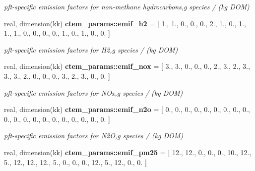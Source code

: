 \begin{DoxyCompactItemize}
\begin{DoxyCompactList}\small\item\em pft-\/specific emission factors for non-\/methane hydrocarbons,g species / (kg D\+O\+M) \end{DoxyCompactList}\item 
\hypertarget{namespacectem__params_a69c1ddbe45fc93ced2664f1fb1781431}{}real, dimension(kk) {\bfseries ctem\+\_\+params\+::emif\+\_\+h2} = \mbox{[} 1., 1., 0., 0., 0., 2., 1., 0., 1., 1., 1., 0., 0., 0., 0., 1., 0., 1., 0., 0. \mbox{]}\label{namespacectem__params_a69c1ddbe45fc93ced2664f1fb1781431}

\begin{DoxyCompactList}\small\item\em pft-\/specific emission factors for H2,g species / (kg D\+O\+M) \end{DoxyCompactList}\item 
\hypertarget{namespacectem__params_a1c3efd30262fdc33811b8179c691fa23}{}real, dimension(kk) {\bfseries ctem\+\_\+params\+::emif\+\_\+nox} = \mbox{[} 3., 3., 0., 0., 0., 2., 3., 2., 3., 3., 3., 2., 0., 0., 0., 3., 2., 3., 0., 0. \mbox{]}\label{namespacectem__params_a1c3efd30262fdc33811b8179c691fa23}

\begin{DoxyCompactList}\small\item\em pft-\/specific emission factors for N\+Ox,g species / (kg D\+O\+M) \end{DoxyCompactList}\item 
\hypertarget{namespacectem__params_a6b6a432b4e081591d12a9699cadd5c19}{}real, dimension(kk) {\bfseries ctem\+\_\+params\+::emif\+\_\+n2o} = \mbox{[} 0., 0., 0., 0., 0., 0., 0., 0., 0., 0., 0., 0., 0., 0., 0., 0., 0., 0., 0., 0. \mbox{]}\label{namespacectem__params_a6b6a432b4e081591d12a9699cadd5c19}

\begin{DoxyCompactList}\small\item\em pft-\/specific emission factors for N2\+O,g species / (kg D\+O\+M) \end{DoxyCompactList}\item 
\hypertarget{namespacectem__params_a89f38c6366d839a93b4cb499ecb49b6b}{}real, dimension(kk) {\bfseries ctem\+\_\+params\+::emif\+\_\+pm25} = \mbox{[} 12., 12., 0., 0., 0., 10., 12., 5., 12., 12., 12., 5., 0., 0., 0., 12., 5., 12., 0., 0. \mbox{]}\label{namespacectem__params_a89f38c6366d839a93b4cb499ecb49b6b}


\end{DoxyCompactItemize}
